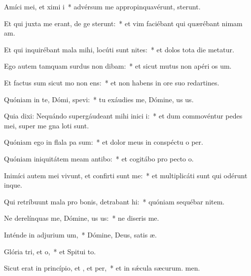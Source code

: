\item Amíci mei, et ximi i~* advérsum me appropinquavérunt,  sterunt.
\item Et qui juxta me erant, de ge sterunt:~* et vim faciébant qui quærébant nimam am.
\item Et qui inquirébant mala mihi, locúti sunt nites:~* et dolos tota die metatur.
\item Ego autem tamquam surdus non dibam:~* et sicut mutus non apéri os um.
\item Et factus sum sicut mo non ens:~* et non habens in ore suo redartines.
\item Quóniam in te, Dómi, spevi:~* tu exáudies me, Dómine, us us.
\item Quia dixi: Nequándo supergáudeant mihi inici i:~* et dum commovéntur pedes mei, super me gna loti sunt.
\item Quóniam ego in flala pa sum:~* et dolor meus in conspéctu o per.
\item Quóniam iniquitátem meam antibo:~* et cogitábo pro pecto o.
\item Inimíci autem mei vivunt, et confirti sunt  me:~* et multiplicáti sunt qui odérunt  inque.
\item Qui retríbuunt mala pro bonis, detrabant hi:~* quóniam sequébar nitem.
\item Ne derelínquas me, Dómine, us us:~* ne diseris  me.
\item Inténde in adjurium um,~* Dómine, Deus, satis æ.
\item Glória tri, et o,~* et Spitui to.
\item Sicut erat in princípio, et , et per,~* et in sǽcula sæcurum. men.
